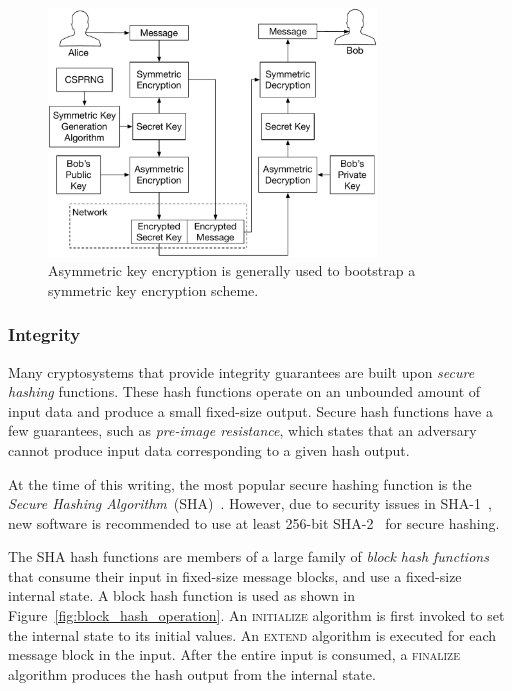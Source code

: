 \begin{figure}[hbt]
  \centering
  \includegraphics[width=87mm]{figures/asymmetric_encryption.pdf}
  \caption{
    Asymmetric key encryption is generally used to bootstrap a symmetric
    key encryption scheme.
  }
  \label{fig:asymmetric_encryption}
\end{figure}


\subsubsection{Integrity}
\label{sec:integrity_crypto}

Many cryptosystems that provide integrity guarantees are built upon
\textit{secure hashing} functions. These hash functions operate on an unbounded
amount of input data and produce a small fixed-size output. Secure hash
functions have a few guarantees, such as \textit{pre-image resistance}, which
states that an adversary cannot produce input data corresponding to a given
hash output.

At the time of this writing, the most popular secure hashing function is the
\textit{Secure Hashing Algorithm}~(SHA)~\cite{eastlake2001sha1}. However, due
to security issues in SHA-1~\cite{stevens2015sha1attack}, new software is
recommended to use at least 256-bit SHA-2~\cite{fips2015shs} for secure
hashing.

The SHA hash functions are members of a large family of \textit{block hash
functions} that consume their input in fixed-size message blocks, and use a
fixed-size internal state. A block hash function is used as shown in
Figure~\ref{fig:block_hash_operation}. An \textsc{initialize} algorithm is
first invoked to set the internal state to its initial values. An
\textsc{extend} algorithm is executed for each message block in the input.
After the entire input is consumed, a \textsc{finalize} algorithm produces the
hash output from the internal state.

